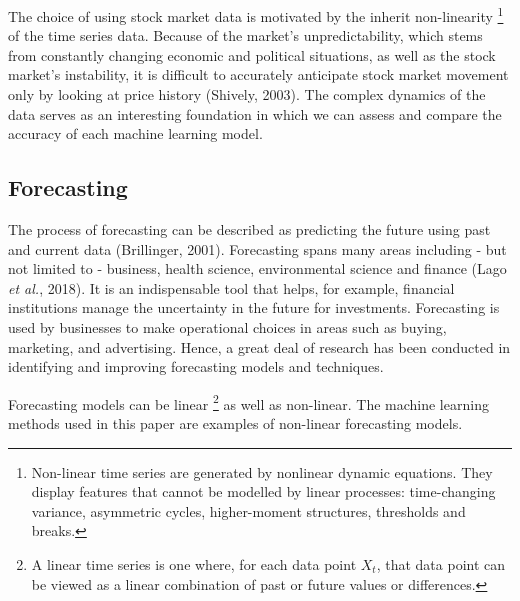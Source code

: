 The choice of using stock market data is motivated by the inherit non-linearity \footnote{Non-linear time series are generated by nonlinear dynamic equations. They display features that cannot be modelled by linear processes: time-changing variance, asymmetric cycles, higher-moment structures, thresholds and breaks.} of the time series data. Because of the market's unpredictability, which stems from constantly changing economic and political situations, as well as the stock market's instability, it is difficult to accurately anticipate stock market movement only by looking at price history (Shively, 2003). The complex dynamics of the data serves as an interesting foundation in which we can assess and compare the accuracy of each machine learning model. 


\subsection{Forecasting}

The process of forecasting can be described as predicting the future using past and current data (Brillinger, 2001). Forecasting spans many areas including - but not limited to - business, health science, environmental science and finance (Lago \textit{et al.}, 2018). It is an indispensable tool that helps, for example, financial institutions manage the uncertainty in the future for investments. Forecasting is used by businesses to make operational choices in areas such as buying, marketing, and advertising. Hence, a great deal of research has been conducted in identifying and improving forecasting models and techniques. 

Forecasting models can be linear \footnote{A linear time series is one where, for each data point $X_t$, that data point can be viewed as a linear combination of past or future values or differences.} as well as non-linear. The machine learning methods used in this paper are examples of non-linear forecasting models. 


